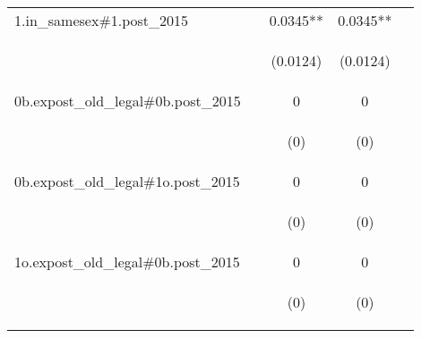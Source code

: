 \documentclass[]{article}
\begin{document}
\begin{center}
\begin{tabular}{lcccc}
1.in\_samesex\#1.post\_2015 &  & 0.0345** & 0.0345** &  \\
\vspace{4pt} & \begin{footnotesize}\end{footnotesize} & \begin{footnotesize}(0.0124)\end{footnotesize} & \begin{footnotesize}(0.0124)\end{footnotesize} & \begin{footnotesize}\end{footnotesize} \\
0b.expost\_old\_legal\#0b.post\_2015 &  & 0 & 0 &  \\
\vspace{4pt} & \begin{footnotesize}\end{footnotesize} & \begin{footnotesize}(0)\end{footnotesize} & \begin{footnotesize}(0)\end{footnotesize} & \begin{footnotesize}\end{footnotesize} \\
0b.expost\_old\_legal\#1o.post\_2015 &  & 0 & 0 &  \\
\vspace{4pt} & \begin{footnotesize}\end{footnotesize} & \begin{footnotesize}(0)\end{footnotesize} & \begin{footnotesize}(0)\end{footnotesize} & \begin{footnotesize}\end{footnotesize} \\
1o.expost\_old\_legal\#0b.post\_2015 &  & 0 & 0 &  \\
\vspace{4pt} & \begin{footnotesize}\end{footnotesize} & \begin{footnotesize}(0)\end{footnotesize} & \begin{footnotesize}(0)\end{footnotesize} & \begin{footnotesize}\end{footnotesize} \\

\end{tabular}
\end{center}
\end{document}
